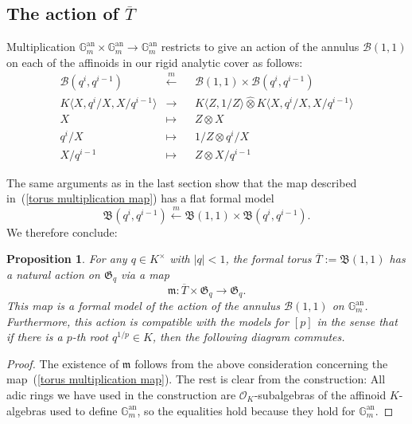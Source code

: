 \documentclass[10pt,oneside]{amsart}
\newtheorem{proposition}[theorem]{Proposition}
\theoremstyle{definition}
\begin{document}
	\subsection{The action of $\overline{T}$}
	Multiplication $\mathbb G_m^{\operatorname{an}}\times \mathbb G_m^{\operatorname{an}}\rightarrow \mathbb G_m^{\operatorname{an}}$ restricts to give an action of the annulus $\mathcal B(1,1)$ on each of the affinoids in our rigid analytic cover as follows: 
	\begin{equation}
	\begin{alignedat}{2} \label{torus multiplication map}
	\mathcal B(q^i,q^{i-1}) &\xleftarrow{m}&& \mathcal B(1,1)\times \mathcal B(q^i,q^{i-1})\\
	K\langle  X,q^i/X, X/q^{i-1} \rangle&\rightarrow &&K\langle Z, 1/Z\rangle\widehat{\otimes} K\langle  X,q^i/X, X/q^{i-1}\rangle\\
	X&\mapsto&& Z\otimes X\\
	q^i/X &\mapsto&& 1/Z\otimes q^i/X\\
	X/q^{i-1} &\mapsto&& Z\otimes X/q^{i-1}
	\end{alignedat}
	\end{equation}

	
	The same arguments as in the last section show that the map described in~(\ref{torus multiplication map}) has a flat formal model
	\[\mathfrak B(q^i,q^{i-1}) \xleftarrow{m} \mathfrak B(1,1)\times \mathfrak B(q^i,q^{i-1}).\] We therefore conclude:
	
	\begin{proposition}\label{action on formal model of torus}
		For any $q\in K^\times$ with $|q|<1$, the formal torus $\overline{T}:=\mathfrak B(1,1)$ has a natural action on $\mathfrak G_q$ via a map
		\[\mathfrak m:\overline{T}\times \mathfrak G_q\rightarrow \mathfrak G_q.\]
		This map is a formal model of the action of the annulus $\mathcal B(1,1)$ on $\mathbb G_m^{\operatorname{an}}$. Furthermore, this action is compatible with the models for $[p]$ in the sense that if there is a $p$-th root $q^{1/p}\in K$, then the following diagram commutes.
		\begin{center}
		\end{center}
	\end{proposition} 
	\begin{proof}
		The existence of $\mathfrak m$ follows from the above consideration concerning the map~(\ref{torus multiplication map}). The rest is clear from the construction: All adic rings we have used in the construction are $\mathcal O_K$-subalgebras of the affinoid $K$-algebras used to define $\mathbb G_m^{\operatorname{an}}$, so the equalities hold because they hold for $\mathbb G_m^{\operatorname{an}}$.
	\end{proof}
	
\end{document}
